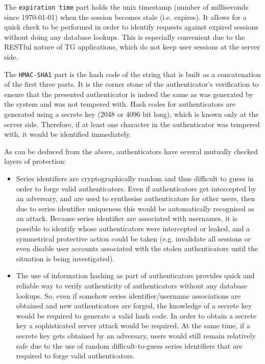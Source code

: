 \documentclass[a4paper,12pt,oneside,openright]{memoir}
\begin{document}
	The \texttt{expiration time} part holds the unix timestamp (number of milliseconds since 1970-01-01) when the session becomes stale (i.e. expires).
	It allows for a quick check to be performed in order to identify requests against expired sessions without doing any database lookups.
	This is especially convenient due to the RESTful nature of TG applications, which do not keep user sessions at the server side.

	The \texttt{HMAC-SHA1} part is the hash code of the string that is built as a concatenation of the first three parts.
	It is the corner stone of the authenticator's verification to ensure that the presented authenticator is indeed the same as was generated by the system and was not tempered with.
	Hash codes for authenticators are generated using a secrete key (2048 or 4096 bit long), which is known only at the server side.
	Therefore, if at least one character in the authenticator was tempered with, it would be identified immediately.

	As can be deduced from the above, authenticators have several mutually checked layers of protection:
	\begin{itemize}
	\item Series identifiers are cryptographically random and thus difficult to guess in order to forge valid authenticators.
	Even if authenticators get intercepted by an adversary, and are used to synthesise authenticators for other users, then due to series identifier uniqueness this would be automatically recognised as an attack.
	Because series identifier are associated with usernames, it is possible to identify whose authenticators were intercepted or leaked, and a symmetrical protective action could be taken (e.g. invalidate all sessions or even disable user accounts associated with the stolen authenticators until the situation is being investigated).

	\item The use of information hashing as part of authenticators provides quick and reliable way to verify authenticity of authenticators without any database lookups.
	So, even if somehow series identifier/username associations are obtained and new authenticators are forged, the knowledge of a secrete key would be required to generate a valid hash code.
	In order to obtain a secrete key a sophisticated server attack would be required.
	At the same time, if a secrete key gets obtained by an adversary, users would still remain relatively safe due to the use of random difficult-to-guess series identifiers that are required to forge valid authenticators.
	\end{itemize}
\end{document}
